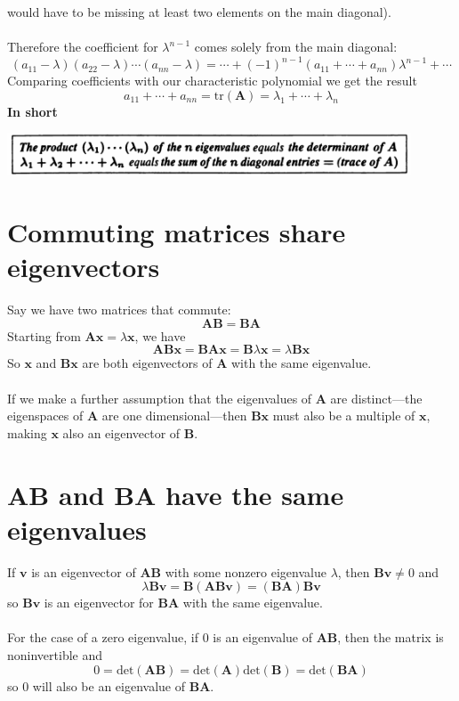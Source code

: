 \documentclass{report}
\begin{document}
would have to be missing at least two elements on the main diagonal).\\
\vspace{1mm}\\
Therefore the coefficient for $\lambda^{n-1}$ comes solely from the main diagonal:
\begin{equation*}
(a_{11}-\lambda)(a_{22}-\lambda)\cdots(a_{nn}-\lambda)=\cdots+(-1)^{n-1}(a_{11}+\cdots+a_{nn})\lambda^{n-1}+\cdots
\end{equation*}
Comparing coefficients with our characteristic polynomial we get the result
\begin{equation*}
a_{11}+\cdots+a_{nn}=\text{tr}(\bm A)=\lambda_1+\cdots+\lambda_n
\end{equation*}
\textbf{In short}
\begin{center}
\includegraphics[width=12cm]{113}
\end{center}
\newpage

\section{Commuting matrices share eigenvectors}
Say we have two matrices that commute:
\begin{equation*}
\bm{AB}=\bm{BA}
\end{equation*}
Starting from $\bm{Ax}=\lambda\bm x$, we have
\begin{equation*}
\bm{AB}\bm x=\bm{BA}\bm x=\bm B\lambda\bm x=\lambda\bm{Bx}
\end{equation*}
So $\bm x$ and $\bm{Bx}$ are both eigenvectors of $\bm A$ with the same eigenvalue.\\
\vspace{1mm}\\
If we make a further assumption that the eigenvalues of $\bm A$ are distinct---the eigenspaces of $\bm A$ are one dimensional---then $\bm{Bx}$ must also be a multiple of 
$\bm x$, making $\bm x$ also an eigenvector of $\bm B$.

\section{$\bm{AB}$ and $\bm{BA}$ have the same eigenvalues}
If $\bm v$ is an eigenvector of $\bm{AB}$ with some nonzero eigenvalue $\lambda$, then $\bm{Bv}\neq0$ and
\begin{equation*}
\lambda\bm{Bv}=\bm B(\bm{ABv})=(\bm{BA})\bm{Bv}
\end{equation*}
so $\bm{Bv}$ is an eigenvector for $\bm{BA}$ with the same eigenvalue.\\
\vspace{1mm}\\
For the case of a zero eigenvalue, if 0 is an eigenvalue of $\bm{AB}$, then the matrix is noninvertible and
\begin{equation*}
0=\text{det}(\bm{AB})=\text{det}(\bm{A})\text{det}(\bm{B})=\text{det}(\bm{BA})
\end{equation*}
so 0 will also be an eigenvalue of $\bm{BA}$.
\newpage
\end{document}
